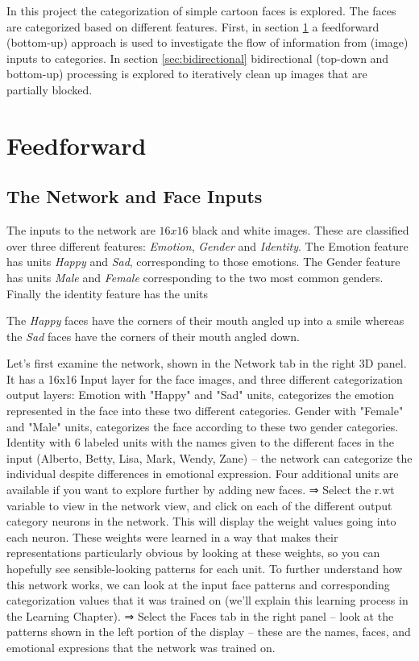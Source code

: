 \documentclass[a4paper]{article}
\begin{document}
In this project the categorization of simple cartoon faces is explored. The faces are categorized based on different features. First, in section \ref{sec:feedforward} a feedforward (bottom-up) approach is used to investigate the flow of information from (image) inputs to categories. In section \ref{sec:bidirectional} bidirectional (top-down and bottom-up) processing is explored to iteratively clean up images that are partially blocked.

\section{Feedforward}
\label{sec:feedforward}

\subsection{The Network and Face Inputs}
The inputs to the network are $16x16$ black and white images. These are classified over three different features: \textit{Emotion}, \textit{Gender} and \textit{Identity}.
The Emotion feature has units \textit{Happy} and \textit{Sad}, corresponding to those emotions. The Gender feature has units \textit{Male} and \textit{Female} corresponding to the two most common genders. Finally the identity feature has the units



The \textit{Happy} faces have the corners of their mouth angled up into a smile whereas the \textit{Sad} faces have the corners of their mouth angled down.


Let's first examine the network, shown in the Network tab in the right 3D panel. It has a 16x16 Input layer for the face images, and three different categorization output layers:
Emotion with "Happy" and "Sad" units, categorizes the emotion represented in the face into these two different categories.
Gender with "Female" and "Male" units, categorizes the face according to these two gender categories.
Identity with 6 labeled units with the names given to the different faces in the input (Alberto, Betty, Lisa, Mark, Wendy, Zane) -- the network can categorize the individual despite differences in emotional expression. Four additional units are available if you want to explore further by adding new faces.
⇒ Select the r.wt variable to view in the network view, and click on each of the different output category neurons in the network. This will display the weight values going into each neuron. 
These weights were learned in a way that makes their representations particularly obvious by looking at these weights, so you can hopefully see sensible-looking patterns for each unit. To further understand how this network works, we can look at the input face patterns and corresponding categorization values that it was trained on (we'll explain this learning process in the Learning Chapter).
⇒ Select the Faces tab in the right panel -- look at the patterns shown in the left portion of the display -- these are the names, faces, and emotional expresions that the network was trained on. 
\end{document}
